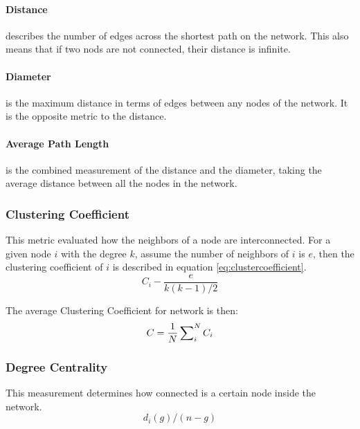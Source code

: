 		\paragraph{Distance} %
		\label{par:distance}
		describes the number of edges across the shortest path on the network.
		This also means that if two nods are not connected,
		their distance is infinite.

		\paragraph{Diameter} %
		\label{par:diameter}
		is the maximum distance in terms of edges between any nodes of the network.
		It is the opposite metric to the distance.

		\paragraph{Average Path Length} %
		\label{par:average_path_length}
		is the combined measurement of the distance and the diameter,
		taking the average distance between all the nodes in the network.

	\subsubsection{Clustering Coefficient} %
	\label{ssub:clustering_coefficient}
		This metric evaluated how the neighbors of a node are interconnected.
		For a given node $i$ with the degree $k$,
		assume the number of neighbors of $i$ is $e$,
		then the clustering coefficient of $i$ is described in equation \ref{eq:clustercoefficient}.
		\begin{equation}
		\label{eq:clustercoefficient}
		C_i - \frac{e}{k(k - 1)/2}
		\end{equation}

		The average Clustering Coefficient for network is then:
		\begin{equation}
		\label{eq:averagecc}
		C = \frac{1}{N} \sideset{}{_i^N}\sum C_i
		\end{equation}

	\subsubsection{Degree Centrality} %
	\label{ssub:degree_centrality}
		This measurement determines how connected is a certain node inside the network.
		\begin{equation}
		\label{eq:degreecentrality}
			d_i(g) / (n-g)
		\end{equation}

